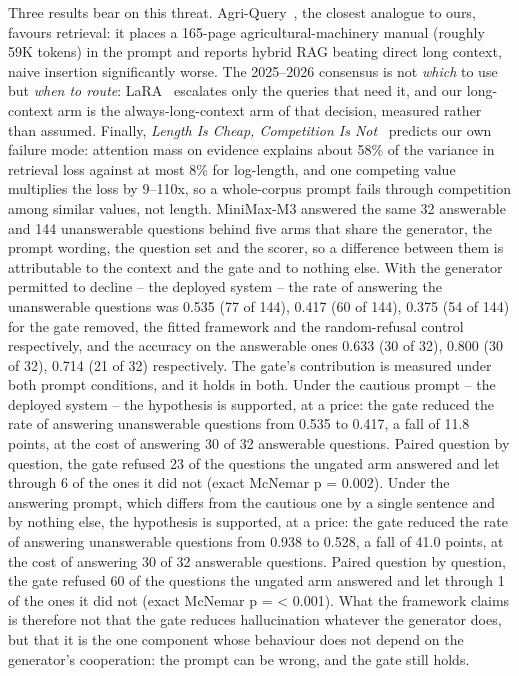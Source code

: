 \documentclass[conference]{IEEEtran}
\begin{document}
Three results bear on this threat. Agri-Query~\cite{chen2026agriquery}, the
closest analogue to ours, favours retrieval: it places a 165-page
agricultural-machinery manual (roughly 59K tokens) in the prompt and reports
hybrid RAG beating direct long context, naive insertion significantly worse.
The 2025--2026 consensus is not \emph{which} to use but \emph{when to route}:
LaRA~\cite{lu2025lara} escalates only the queries that need it, and our
long-context arm is the always-long-context arm of that decision, measured
rather than assumed. Finally, \emph{Length Is Cheap, Competition Is Not}~\cite{liu2026lengthcheap}
predicts our own failure mode: attention mass on evidence explains about 58\%
of the variance in retrieval loss against at most 8\% for log-length, and one
competing value multiplies the loss by 9--110x, so a whole-corpus prompt fails
through competition among similar values, not length.
MiniMax-M3 answered the same 32 answerable and 144 unanswerable questions behind five arms that share the generator, the prompt wording, the question set and the scorer, so a difference between them is attributable to the context and the gate and to nothing else. With the generator permitted to decline -- the deployed system -- the rate of answering the unanswerable questions was 0.535 (77 of 144), 0.417 (60 of 144), 0.375 (54 of 144) for the gate removed, the fitted framework and the random-refusal control respectively, and the accuracy on the answerable ones 0.633 (30 of 32), 0.800 (30 of 32), 0.714 (21 of 32) respectively. The gate's contribution is measured under both prompt conditions, and it holds in both. Under the cautious prompt -- the deployed system -- the hypothesis is supported, at a price: the gate reduced the rate of answering unanswerable questions from 0.535 to 0.417, a fall of 11.8 points, at the cost of answering 30 of 32 answerable questions. Paired question by question, the gate refused 23 of the questions the ungated arm answered and let through 6 of the ones it did not (exact McNemar p = 0.002). Under the answering prompt, which differs from the cautious one by a single sentence and by nothing else, the hypothesis is supported, at a price: the gate reduced the rate of answering unanswerable questions from 0.938 to 0.528, a fall of 41.0 points, at the cost of answering 30 of 32 answerable questions. Paired question by question, the gate refused 60 of the questions the ungated arm answered and let through 1 of the ones it did not (exact McNemar p = < 0.001). What the framework claims is therefore not that the gate reduces hallucination whatever the generator does, but that it is the one component whose behaviour does not depend on the generator's cooperation: the prompt can be wrong, and the gate still holds.
\end{document}
